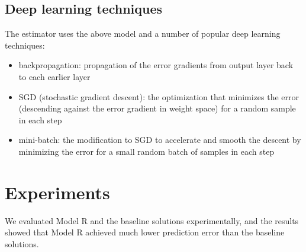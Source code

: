 \documentclass[letterpaper]{article}
\begin{document}
\subsection{Deep learning techniques}
The estimator uses the above model and a number of popular deep learning 
techniques:
\begin{itemize}
	\item backpropagation: propagation of the error gradients from output layer 
	back to each earlier layer \citeauthor{rumelhart1988learning}
	\item SGD (stochastic gradient descent): the optimization that minimizes 
	the error (descending against the error gradient in weight space) for a 
	random sample in each step \citeauthor{lecun2012efficient}
	\item mini-batch: the modification to SGD to accelerate and smooth the 
	descent by minimizing the error for a small random batch of samples in 
	each step \citeauthor{mairal2010online}
\end{itemize}

\section{Experiments}
We evaluated Model R and the baseline solutions experimentally,
and the results showed that Model R achieved much lower prediction error than 
the baseline solutions.
\end{document}
